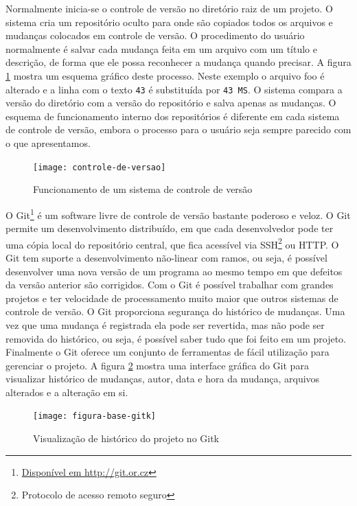 Normalmente inicia-se o controle de versão no diretório raiz de um
projeto. O sistema cria um repositório oculto para onde são copiados
todos os arquivos e mudanças colocados em controle de versão. O
procedimento do usuário normalmente é salvar cada mudança feita em um
arquivo com um título e descrição, de forma que ele possa reconhecer a
mudança quando precisar. A figura \ref{fig:controle-de-versao} mostra
um esquema gráfico deste processo. Neste exemplo o arquivo foo é
alterado e a linha com o texto \verb!43! é substituída por
\verb!43 MS!. O sistema compara a versão do diretório com a versão do
repositório e salva apenas as mudanças. O esquema de funcionamento
interno dos repositórios é diferente em cada sistema de controle de
versão, embora o processo para o usuário seja sempre parecido com o
que apresentamos.

\begin{figure}
  \centering
  \texttt{[image: controle-de-versao]}
  \caption{Funcionamento de um sistema de controle de versão}
  \label{fig:controle-de-versao}
\end{figure}

O Git\footnote{\url{Disponível em http://git.or.cz}} é um software
livre de controle de versão bastante poderoso e veloz. O Git permite
um desenvolvimento distribuído, em que cada desenvolvedor pode ter uma
cópia local do repositório central, que fica acessível via
SSH\footnote{Protocolo de acesso remoto seguro} ou HTTP. O Git tem
suporte a desenvolvimento não-linear com ramos, ou seja, é possível
desenvolver uma nova versão de um programa ao mesmo tempo em que
defeitos da versão anterior são corrigidos. Com o Git é possível
trabalhar com grandes projetos e ter velocidade de processamento muito
maior que outros sistemas de controle de versão. O Git proporciona
segurança do histórico de mudanças. Uma vez que uma mudança é
registrada ela pode ser revertida, mas não pode ser removida do
histórico, ou seja, é possível saber tudo que foi feito em um
projeto. Finalmente o Git oferece um conjunto de ferramentas de fácil
utilização para gerenciar o projeto. A figura \ref{fig:historico-git}
mostra uma interface gráfica do Git para visualizar histórico de
mudanças, autor, data e hora da mudança, arquivos alterados e a
alteração em si.

\begin{figure}
  \centering
  \texttt{[image: figura-base-gitk]}
  \caption{Visualização de histórico do projeto no Gitk}
  \label{fig:historico-git}
\end{figure}

